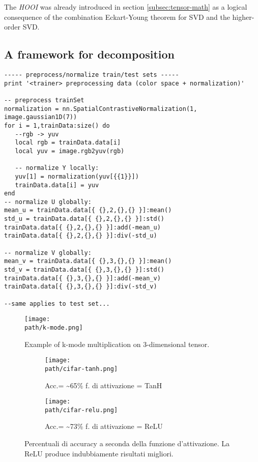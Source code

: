 The \emph{HOOI} was already introduced in section \ref{subsec:tensor-math} as a logical consequence of the combination Eckart-Young theorem for SVD and the higher-order SVD. 
\subsection{A framework for decomposition}
\label{subsec:framework}










\begin{lstlisting}[language={[5.2]Lua}]
----- preprocess/normalize train/test sets -----
print '<trainer> preprocessing data (color space + normalization)'

-- preprocess trainSet
normalization = nn.SpatialContrastiveNormalization(1, image.gaussian1D(7))
for i = 1,trainData:size() do
   --rgb -> yuv
   local rgb = trainData.data[i]
   local yuv = image.rgb2yuv(rgb)
   
   -- normalize Y locally:
   yuv[1] = normalization(yuv[{{1}}])
   trainData.data[i] = yuv
end
-- normalize U globally:
mean_u = trainData.data[{ {},2,{},{} }]:mean()
std_u = trainData.data[{ {},2,{},{} }]:std()
trainData.data[{ {},2,{},{} }]:add(-mean_u)
trainData.data[{ {},2,{},{} }]:div(-std_u)

-- normalize V globally:
mean_v = trainData.data[{ {},3,{},{} }]:mean()
std_v = trainData.data[{ {},3,{},{} }]:std()
trainData.data[{ {},3,{},{} }]:add(-mean_v)
trainData.data[{ {},3,{},{} }]:div(-std_v)

--same applies to test set...
\end{lstlisting}



\begin{figure}[h!]
 \centering
 \texttt{[image: \\path/k-mode.png]} 
  \caption{Example of k-mode multiplication on 3-dimensional tensor.}
 \label{fig:k-mode}
\end{figure}

\bigskip

\begin{figure}
\centering
\begin{subfigure}{.5\textwidth}
  \centering
 \texttt{[image: \\path/cifar-tanh.png]} 
  \caption{Acc.= \textasciitilde 65\% f. di attivazione = TanH}
 \label{fig:training}
\end{subfigure}%
\begin{subfigure}{.5\textwidth}
  \centering
 \texttt{[image: \\path/cifar-relu.png]} 
  \caption{Acc.= \textasciitilde 73\% f. di attivazione = ReLU}
 \label{fig:validation}
\end{subfigure}
\caption{Percentuali di accuracy a seconda della funzione d'attivazione. La ReLU produce indubbiamente risultati migliori.}
\label{fig:relu}
\end{figure}
\\
\newpage
\pagebreak
\medskip
\newpage

